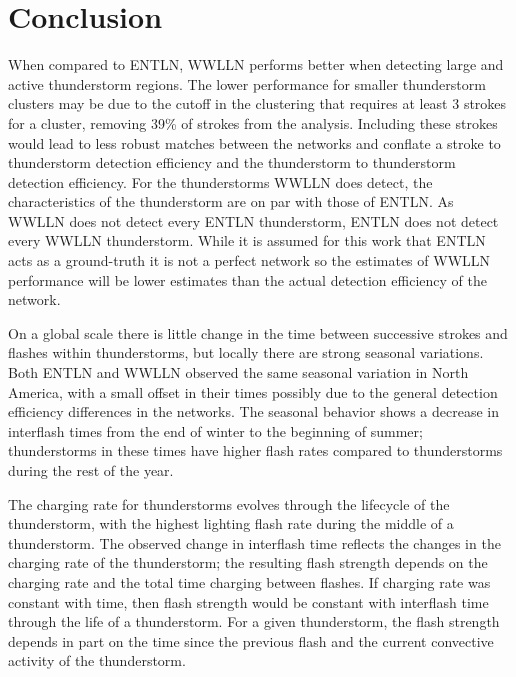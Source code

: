\section{Conclusion}


When compared to ENTLN, WWLLN performs better when detecting large and active thunderstorm regions.
The lower performance for smaller thunderstorm clusters may be due to the cutoff in the clustering that requires at least 3 strokes for a cluster, removing 39\% of strokes from the analysis.
Including these strokes would lead to less robust matches between the networks and conflate a stroke to thunderstorm detection efficiency and the thunderstorm to thunderstorm detection efficiency.
For the thunderstorms WWLLN does detect, the characteristics of the thunderstorm are on par with those of ENTLN.
As WWLLN does not detect every ENTLN thunderstorm, ENTLN does not detect every WWLLN thunderstorm.
While it is assumed for this work that ENTLN acts as a ground-truth it is not a perfect network so the estimates of WWLLN performance will be lower estimates than the actual detection efficiency of the network.


On a global scale there is little change in the time between successive strokes and flashes within thunderstorms, but locally there are strong seasonal variations.
Both ENTLN and WWLLN observed the same seasonal variation in North America, with a small offset in their times possibly due to the general detection efficiency differences in the networks.
The seasonal behavior shows a decrease in interflash times from the end of winter to the beginning of summer; thunderstorms in these times have higher flash rates compared to thunderstorms during the rest of the year.

The charging rate for thunderstorms evolves through the lifecycle of the thunderstorm, with the highest lighting flash rate during the middle of a thunderstorm.
The observed change in interflash time reflects the changes in the charging rate of the thunderstorm; the resulting flash strength depends on the charging rate and the total time charging between flashes.
If charging rate was constant with time, then flash strength would be constant with interflash time through the life of a thunderstorm.
For a given thunderstorm, the flash strength depends in part on the time since the previous flash and the current convective activity of the thunderstorm.
